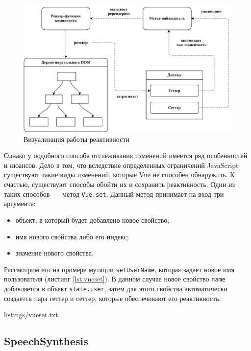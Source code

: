 \begin{figure}[h]
	\centering
	\includegraphics[width=\textwidth]{figures/reactivity}
	\caption{Визуализация работы реактивности}
	\label{fig:react}
\end{figure}

Однако у подобного способа отслеживания изменений имеется ряд особенностей и нюансов. Дело в том, что вследствие определенных ограничений JavaScript существуют такие виды изменений, которые Vue не способен обнаружить. К счастью, существуют способы обойти их и сохранить реактивность. Один из таких способов~--- метод \texttt{Vue.set}. Данный метод принимает на вход три аргумента:

\begin{itemize}
	\item объект, в который будет добавлено новое свойство;
	\item имя нового свойства либо его индекс;
	\item значение нового свойства.
\end{itemize}

Рассмотрим его на примере мутации \texttt{setUserName}, которая задает новое имя пользователя (листинг \ref{lst:vueset}). В данном случае новое свойство \texttt{name} добавляется в объект \texttt{state.user}, затем для этого свойства автоматически создается пара геттер и сеттер, которые обеспечивают его реактивность.


{listings/vueset.txt}

\subsection{SpeechSynthesis}

